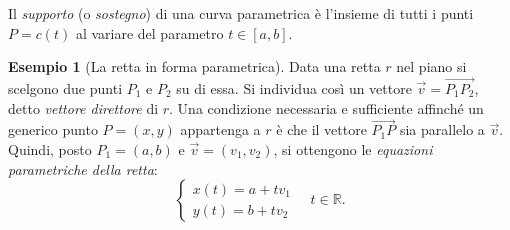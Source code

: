 \documentclass[11pt,a4paper]{article}
\theoremstyle{definition}
\newtheorem*{esempio}{Esempio}
\begin{document}
\begin{definizione}
Il \emph{supporto} (o \emph{sostegno}) di una curva parametrica è l'insieme di tutti i punti $P = c(t)$ al variare del parametro $t \in [a, b]$.
\end{definizione}

\begin{esempio}[La retta in forma parametrica]
Data una retta $r$ nel piano si scelgono due punti $P_1$ e $P_2$ su di essa. Si individua così un vettore $\vec v = \overrightarrow{P_1P_2}$, detto \emph{vettore direttore} di $r$. Una condizione necessaria e sufficiente affinché un generico punto $P = (x, y)$ appartenga a $r$ è che il vettore $\overrightarrow{P_1P}$ sia parallelo a $\vec v$. Quindi, posto $P_1 = (a, b)$ e $\vec v = (v_1, v_2)$, si ottengono le \emph{equazioni parametriche della retta}:
\[
\begin{cases} x(t) = a + t v_1 \\ y(t) = b + t v_2 \end{cases} \quad t \in \mathbb{R}.
\]
\end{esempio}
\end{document}
